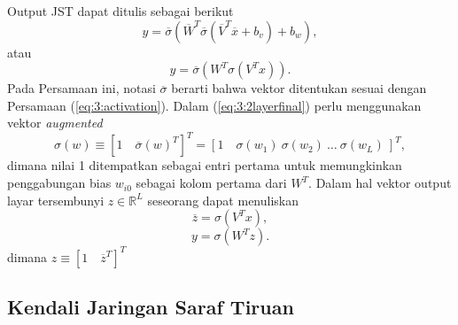 \noindent Output JST dapat ditulis sebagai berikut
\begin{equation} \label{eq:3:2layer}
y = \overline{\sigma}
\left(
	\overline{W}^T\overline{\sigma}(\overline{V}^T\overline{x}+b_v)+b_w
\right),
\end{equation}
atau
\begin{equation} \label{eq:3:2layerfinal}
y = \overline{\sigma}
\left(
	W^T\sigma(V^Tx)
\right).
\end{equation}
Pada Persamaan ini, notasi $\overline{\sigma}$ berarti bahwa vektor ditentukan sesuai dengan Persamaan (\ref{eq:3:activation}). Dalam (\ref{eq:3:2layerfinal}) perlu menggunakan vektor \textit{augmented}
\begin{equation} \label{eq:3:augVector}
\sigma(w) \equiv [1\quad \overline{\sigma}(w)^T]^T = [1\quad \sigma(w_1)\ \sigma(w_2)\ \dots\ \sigma(w_L)\ ]^T,
\end{equation}
\noindent dimana nilai 1 ditempatkan sebagai entri pertama untuk memungkinkan penggabungan bias $w_{i0}$ sebagai kolom pertama dari $W^T$. Dalam hal vektor output layar tersembunyi $z\in \mathbb{R}^L$ seseorang dapat menuliskan
\begin{equation} \label{eq:3:final19}
\overline{z} = \sigma(V^Tx),
\end{equation}
\begin{equation} \label{eq:3:final20}
y = \sigma(W^Tz).
\end{equation}
\noindent dimana $z \equiv [1\quad \overline{z}^T]^T$

\subsection{Kendali Jaringan Saraf Tiruan}

